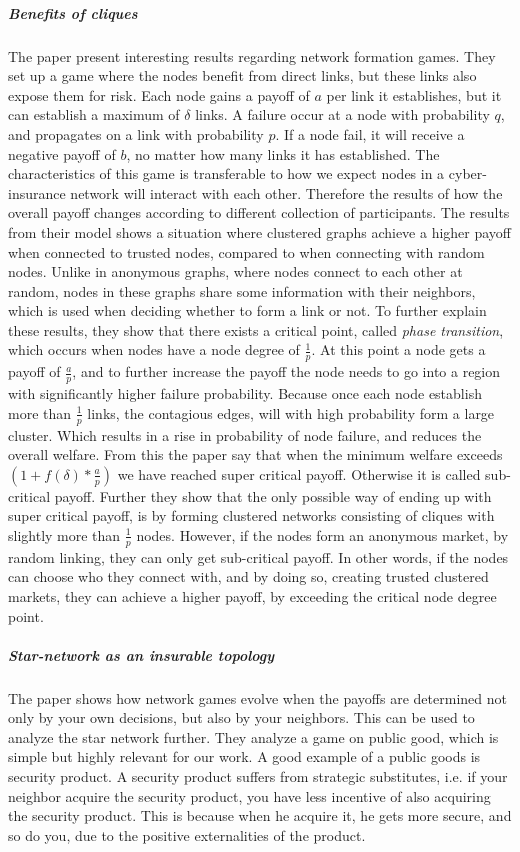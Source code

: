 \subparagraph{Benefits of cliques}
The paper \cite{contagion} present interesting results regarding network formation games. 
They set up a game where the nodes benefit from direct links, but these links also expose them for risk. 
Each node gains a payoff of $a$ per link it establishes, but it can establish a maximum of $\delta$ links.
A failure occur at a node with probability $q$, and propagates on a link with probability $p$. If a node fail, it will receive a negative payoff of $b$, no matter how many links it has established. The characteristics of this game is transferable to how we expect nodes in a cyber-insurance network will interact with each other. Therefore the results of how the overall payoff changes according to different collection of participants. 
The results from their model shows a situation where clustered graphs achieve a higher payoff when connected to trusted nodes, compared to when connecting with random nodes. Unlike in anonymous graphs, where nodes connect to each other at random, nodes in these graphs share some information with their neighbors, which is used when deciding whether to form a link or not. 
To further explain these results, they show that there exists a critical point, called \textit{phase transition}, which occurs when nodes have a node degree of $\frac{1}{p}$. 
At this point a node gets a payoff of $\frac{a}{p}$, and to further increase the payoff the node needs to go into a region with significantly higher failure probability. 
Because once each node establish more than $\frac{1}{p}$ links, the contagious edges, will with high probability form a large cluster. Which results in a rise in probability of node failure, and reduces the overall welfare.
From this the paper say that when the minimum welfare exceeds 
$(1+f(\delta)*\frac{a}{p})$
we have reached super critical payoff. Otherwise it is called sub-critical payoff. 
Further they show that the only possible way of ending up with super critical payoff, is by forming clustered networks consisting of cliques with slightly more than $\frac{1}{p}$ nodes. 
However, if the nodes form an anonymous market, by random linking, they can only get sub-critical payoff. 
In other words, if the nodes can choose who they connect with, and by doing so, creating trusted clustered markets, they can achieve a higher payoff, by exceeding the critical node degree point. 


\subparagraph{Star-network as an insurable topology}
The paper \cite{networkgames} shows how network games evolve when the payoffs are determined not only by your own decisions, but also by your neighbors. This can be used to analyze the star network further. They analyze a game on public good, which is simple but highly relevant for our work. A good example of a public goods is security product. A security product suffers from strategic substitutes, i.e. if your neighbor acquire the security product, you have less incentive of also acquiring the security product. This is because when he acquire it, he gets more secure, and so do you, due to the positive externalities of the product.

